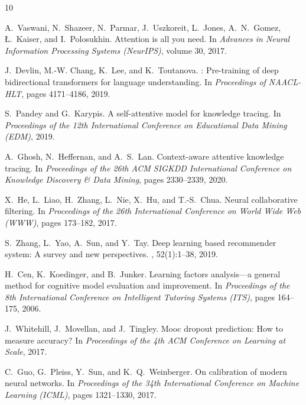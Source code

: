 \documentclass[12pt]{article}
\begin{document}

\begin{thebibliography}{10}

A.~Vaswani, N.~Shazeer, N.~Parmar, J.~Uszkoreit, L.~Jones, A.~N.~Gomez, {\L}.~Kaiser, and I.~Polosukhin.
\newblock Attention is all you need.
\newblock In {\em Advances in Neural Information Processing Systems (NeurIPS)}, volume 30, 2017.

J.~Devlin, M.-W. Chang, K.~Lee, and K.~Toutanova.
: Pre-training of deep bidirectional transformers for language understanding.
\newblock In {\em Proceedings of NAACL-HLT}, pages 4171--4186, 2019.

S.~Pandey and G.~Karypis.
\newblock A self-attentive model for knowledge tracing.
\newblock In {\em Proceedings of the 12th International Conference on Educational Data Mining (EDM)}, 2019.

A.~Ghosh, N.~Heffernan, and A.~S.~Lan.
\newblock Context-aware attentive knowledge tracing.
\newblock In {\em Proceedings of the 26th ACM SIGKDD International Conference on Knowledge Discovery \& Data Mining}, pages 2330--2339, 2020.

X.~He, L.~Liao, H.~Zhang, L.~Nie, X.~Hu, and T.-S.~Chua.
\newblock Neural collaborative filtering.
\newblock In {\em Proceedings of the 26th International Conference on World Wide Web (WWW)}, pages 173--182, 2017.

S.~Zhang, L.~Yao, A.~Sun, and Y.~Tay.
\newblock Deep learning based recommender system: A survey and new perspectives.
, 52(1):1--38, 2019.

H.~Cen, K.~Koedinger, and B.~Junker.
\newblock Learning factors analysis---a general method for cognitive model evaluation and improvement.
\newblock In {\em Proceedings of the 8th International Conference on Intelligent Tutoring Systems (ITS)}, pages 164--175, 2006.

J.~Whitehill, J.~Movellan, and J.~Tingley.
\newblock Mooc dropout prediction: How to measure accuracy?
\newblock In {\em Proceedings of the 4th ACM Conference on Learning at Scale}, 2017.

C.~Guo, G.~Pleiss, Y.~Sun, and K.~Q.~Weinberger.
\newblock On calibration of modern neural networks.
\newblock In {\em Proceedings of the 34th International Conference on Machine Learning (ICML)}, pages 1321--1330, 2017.


\end{thebibliography}
\end{document}
